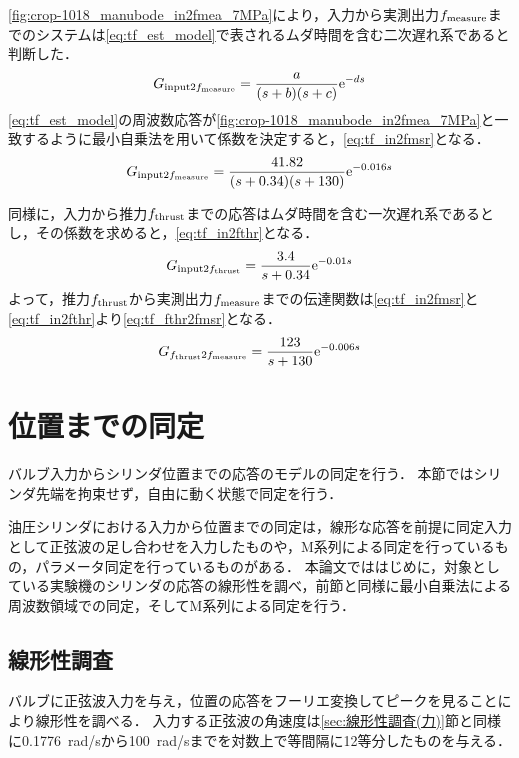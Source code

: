 \figname\ref{fig:crop-1018_manubode_in2fmea_7MPa}により，入力から実測出力$f_\mathrm{measure}$までのシステムは\eqnname\ref{eq:tf_est_model}で表されるムダ時間を含む二次遅れ系であると判断した．
\begin{align}
    \label{eq:tf_est_model}
    G_{\mathrm{input}2f_\mathrm{measure}} = \frac{a}{(s+b)(s+c)}\mathrm{e}^{-ds}
\end{align}
\eqnname\ref{eq:tf_est_model}の周波数応答が\figname\ref{fig:crop-1018_manubode_in2fmea_7MPa}と一致するように最小自乗法を用いて係数を決定すると，\eqnname\ref{eq:tf_in2fmsr}となる．
\begin{align}
    \label{eq:tf_in2fmsr}
    G_{\mathrm{input}2f_\mathrm{measure}} = \frac{41.82}{(s+0.34)(s+130)}\mathrm{e}^{-0.016s}
\end{align}

同様に，入力から推力$f_\mathrm{thrust}$までの応答はムダ時間を含む一次遅れ系であるとし，その係数を求めると，\eqnname\ref{eq:tf_in2fthr}となる．
\begin{align}
    \label{eq:tf_in2fthr}
    G_{\mathrm{input}2f_\mathrm{thrust}} = \frac{3.4}{s+0.34}\mathrm{e}^{-0.01s}
\end{align}
よって，推力$f_\mathrm{thrust}$から実測出力$f_\mathrm{measure}$までの伝達関数は\eqnname\ref{eq:tf_in2fmsr}と\eqnname\ref{eq:tf_in2fthr}より\eqnname\ref{eq:tf_fthr2fmsr}となる．
\begin{align}
    \label{eq:tf_fthr2fmsr}
    G_{f_\mathrm{thrust}2f_\mathrm{measure}} = \frac{123}{s+130}\mathrm{e}^{-0.006s}
\end{align}
\section{位置までの同定}
\label{sec:位置までの同定}
バルブ入力からシリンダ位置までの応答のモデルの同定を行う．
本節ではシリンダ先端を拘束せず，自由に動く状態で同定を行う．

油圧シリンダにおける入力から位置までの同定は，線形な応答を前提に同定入力として正弦波の足し合わせを入力したもの\cite{ling2012system,zheng2009application}や，M系列による同定を行っているもの\cite{松本貴夢20166,松本貴夢2016}，パラメータ同定を行っているもの\cite{前島祐三2011}がある．
本論文でははじめに，対象としている実験機のシリンダの応答の線形性を調べ，前節と同様に最小自乗法による周波数領域での同定，そしてM系列による同定を行う．
\subsection{線形性調査}
バルブに正弦波入力を与え，位置の応答をフーリエ変換してピークを見ることにより線形性を調べる．
入力する正弦波の角速度は\ref{sec:線形性調査(力)}節と同様に\SI{0.1776}{rad/s}から\SI{100}{rad/s}までを対数上で等間隔に12等分したものを与える．

